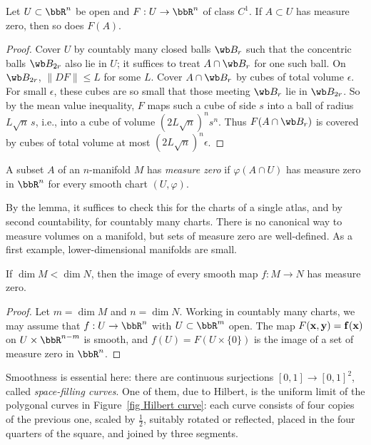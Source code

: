 \begin{lem}\label{lem C1 preserves measure zero}
    Let $U\subset\bbR^n$ be open and $F:U\to\bbR^n$ of class $C^1$. If $A\subset U$ has measure zero, then so does $F(A)$.
\end{lem}
\begin{proof}
    Cover $U$ by countably many closed balls $\wb B_r$ such that the concentric balls $\wb B_{2r}$ also lie in $U$; it suffices to treat $A\cap\wb B_r$ for one such ball. On $\wb B_{2r}$, $\lVert DF\rVert\leq L$ for some $L$. Cover $A\cap\wb B_r$ by cubes of total volume $\epsilon$. For small $\epsilon$, these cubes are so small that those meeting $\wb B_r$ lie in $\wb B_{2r}$. So by the mean value inequality, $F$ maps such a cube of side $s$ into a ball of radius $L\sqrt n\,s$, i.e., into a cube of volume $(2L\sqrt n)^ns^n$. Thus $F(A\cap\wb B_r)$ is covered by cubes of total volume at most $(2L\sqrt n)^n\epsilon$.
\end{proof}

\begin{defn}
    A subset $A$ of an $n$-manifold $M$ has \emph{measure zero} if $\varphi(A\cap U)$ has measure zero in $\bbR^n$ for every smooth chart $(U,\varphi)$.
\end{defn}
By the lemma, it suffices to check this for the charts of a single atlas, and by second countability, for countably many charts. There is no canonical way to measure volumes on a manifold, but sets of measure zero are well-defined. As a first example, lower-dimensional manifolds are small.

\begin{prop}\label{prop mini Sard}
    If $\dim M<\dim N$, then the image of every smooth map $f:M\to N$ has measure zero.
\end{prop}
\begin{proof}
    Let $m=\dim M$ and $n=\dim N$. Working in countably many charts, we may assume that $f:U\to\bbR^n$ with $U\subset\bbR^m$ open. The map $F(\bf{x},\bf{y})=f(\bf{x})$ on $U\times\bbR^{n-m}$ is smooth, and $f(U)=F(U\times\{0\})$ is the image of a set of measure zero in $\bbR^n$.
\end{proof}

Smoothness is essential here: there are continuous surjections $[0,1]\to[0,1]^2$, called \emph{space-filling curves}. One of them, due to Hilbert, is the uniform limit of the polygonal curves in Figure~\ref{fig Hilbert curve}: each curve consists of four copies of the previous one, scaled by $\frac12$, suitably rotated or reflected, placed in the four quarters of the square, and joined by three segments.

